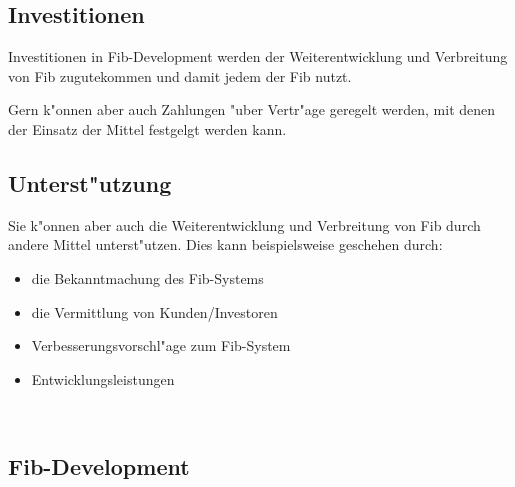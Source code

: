 \documentclass[12pt,a4paper]{article}
\begin{document}
\subsection{Investitionen}

Investitionen in Fib-Development werden der Weiterentwicklung und Verbreitung von Fib zugutekommen und damit jedem der Fib nutzt.

Gern k"onnen aber auch Zahlungen "uber Vertr"age geregelt werden, mit denen der Einsatz der Mittel festgelgt werden kann.

%

\subsection{Unterst"utzung}

Sie k"onnen aber auch die Weiterentwicklung und Verbreitung von Fib durch andere Mittel unterst"utzen.
Dies kann beispielsweise geschehen durch:
\begin{itemize}
 \item die Bekanntmachung des Fib-Systems
 \item die Vermittlung von Kunden/Investoren
 \item Verbesserungsvorschl"age zum Fib-System
 \item Entwicklungsleistungen
\end{itemize}
\ \vspace{-0.60cm}

\subsection{Fib-Development}
\end{document}
